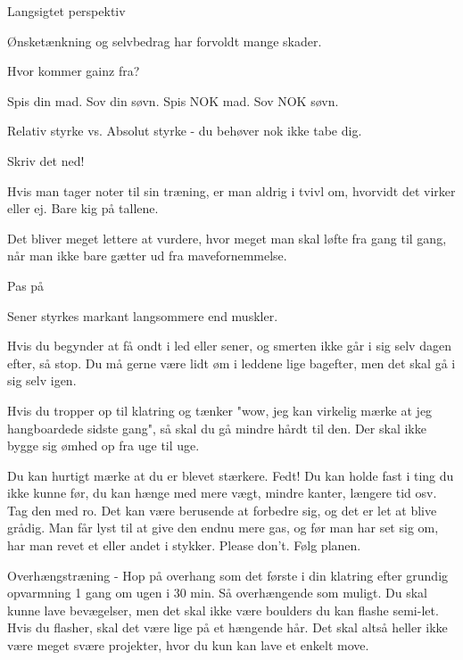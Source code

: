 \begin{multicols}{2}
\begin{tList}{Langsigtet perspektiv}
\item Ønsketænkning og selvbedrag har forvoldt mange skader.
\end{tList}

\begin{tList}{Hvor kommer gainz fra?}

\item Spis din mad. Sov din søvn. Spis NOK mad. Sov NOK søvn.
\item Relativ styrke vs. Absolut styrke - du behøver nok ikke tabe dig.
\end{tList}

\begin{tList}{Skriv det ned!}

\item Hvis man tager noter til sin træning, er man aldrig i tvivl om, hvorvidt det virker eller ej. Bare kig på tallene.
\item Det bliver meget lettere at vurdere, hvor meget man skal løfte fra gang til gang, når man ikke bare gætter ud fra mavefornemmelse.
\end{tList}

\begin{tList}{Pas på}
\item Sener styrkes markant langsommere end muskler.

\item Hvis du begynder at få ondt i led eller sener, og smerten ikke går i sig selv dagen efter, så stop. Du må gerne være lidt øm i leddene lige bagefter, men det skal gå i sig selv igen.

\item Hvis du tropper op til klatring og tænker "wow, jeg kan virkelig mærke at jeg hangboardede sidste gang", så skal du gå mindre hårdt til den. Der skal ikke bygge sig ømhed op fra uge til uge.
\end{tList}

Du kan hurtigt mærke at du er blevet stærkere. Fedt! Du kan holde fast i ting du ikke kunne før, du kan hænge med mere vægt, mindre kanter, længere tid osv. Tag den med ro. Det kan være berusende at forbedre sig, og det er let at blive grådig. Man får lyst til at give den endnu mere gas, og før man har set sig om, har man revet et eller andet i stykker. Please don't. Følg planen.



Overhængstræning - Hop på overhang som det første i din klatring efter grundig opvarmning 1 gang om ugen i 30 min. Så overhængende som muligt. Du skal kunne lave bevægelser, men det skal ikke være boulders du kan flashe semi-let. Hvis du flasher, skal det være lige på et hængende hår. Det skal altså heller ikke være meget svære projekter, hvor du kun kan lave et enkelt move.


\end{multicols}
